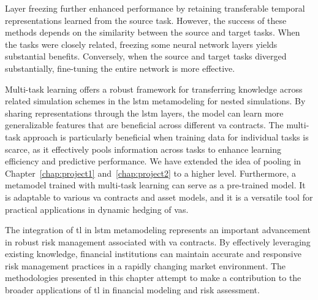 Layer freezing further enhanced performance by retaining transferable temporal representations learned from the source task. 
However, the success of these methods depends on the similarity between the source and target tasks. 
When the tasks were closely related, freezing some neural network layers yields substantial benefits. 
Conversely, when the source and target tasks diverged substantially, fine-tuning the entire network is more effective.

Multi-task learning offers a robust framework for transferring knowledge across related simulation schemes in the \gls{lstm} metamodeling for nested simulations. 
By sharing representations through the \gls{lstm} layers, the model can learn more generalizable features that are beneficial across different \gls{va} contracts. 
The multi-task approach is particularly beneficial when training data for individual tasks is scarce, as it effectively pools information across tasks to enhance learning efficiency and predictive performance.
We have extended the idea of pooling in Chapter~\ref{chap:project1} and~\ref{chap:project2} to a higher level.
Furthermore, a metamodel trained with multi-task learning can serve as a pre-trained model. 
It is adaptable to various \gls{va} contracts and asset models, and it is a versatile tool for practical applications in dynamic hedging of \gls{va}s.

The integration of \gls{tl} in \gls{lstm} metamodeling represents an important advancement in robust risk management associated with \gls{va} contracts.
By effectively leveraging existing knowledge, financial institutions can maintain accurate and responsive risk management practices in a rapidly changing market environment. 
The methodologies presented in this chapter attempt to make a contribution to the broader applications of \gls{tl} in financial modeling and risk assessment.

